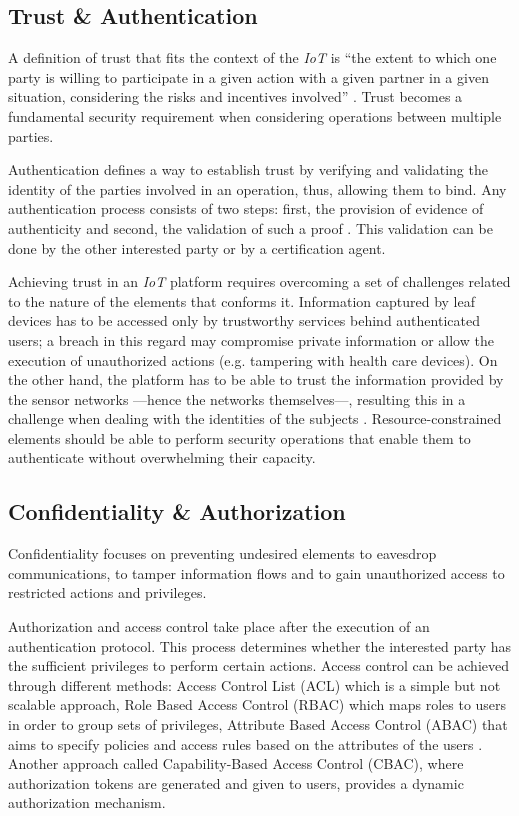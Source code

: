 \documentclass[journal]{IEEEtran}
\begin{document}
  \subsection{Trust \& Authentication} \label{Trust}
  A definition of trust that fits the context of the \emph{IoT} is ``the extent to which one party is willing to participate in a given action with a given partner in a given situation, considering the risks and incentives involved'' \cite{Ruohomaa2006}. Trust becomes a fundamental security requirement when considering operations between multiple parties.

  Authentication defines a way to establish trust by verifying and validating the identity of the parties involved in an operation, thus, allowing them to bind. Any authentication process consists of two steps: first, the provision of evidence of authenticity and second, the validation of such a proof \cite{Sklavos2007}. This validation can be done by the other interested party or by a certification agent.

  Achieving trust in an \emph{IoT} platform requires overcoming a set of challenges related to the nature of the elements that conforms it. Information captured by leaf devices has to be accessed only by trustworthy services behind authenticated users; a breach in this regard may compromise private information or allow the execution of unauthorized actions (e.g. tampering with health care devices). On the other hand, the platform has to be able to trust the information provided by the sensor networks ---hence the networks themselves---, resulting this in a challenge when dealing with the identities of the subjects \cite{Kanuparthi2013}. Resource-constrained elements should be able to perform security operations that enable them to authenticate without overwhelming their capacity. 

  \subsection{Confidentiality \& Authorization} \label{Confidentiality}
  Confidentiality focuses on preventing undesired elements to eavesdrop communications, to tamper information flows and to gain unauthorized access to restricted actions and privileges.

  Authorization and access control take place after the execution of an authentication protocol. This process determines whether the interested party has the sufficient privileges to perform certain actions. Access control can be achieved through different methods: Access Control List (ACL) which is a simple but not scalable approach, Role Based Access Control (RBAC) which maps roles to users in order to group sets of privileges, Attribute Based Access Control (ABAC) that aims to specify policies and access rules based on the attributes of the users  \cite{Anggorojati2014}. Another approach called Capability-Based Access Control (CBAC), where authorization tokens are generated and given to users, provides a dynamic authorization mechanism.
\end{document}
